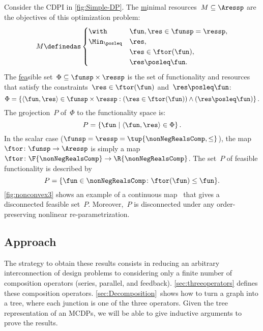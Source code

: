 \begin{example}
  \label{exa:one}
  Consider the CDPI in \cref{fig:Simple-DP}. The \uline{m}inimal resources~$M\subseteq\Aressp$ are the objectives of this optimization problem:
  \[
    M\definedas\begin{cases}
                 \with & \fun,\res\in\funsp=\ressp,\\
                 \Min_{\posleq} & \res,\\
                 & \res\in\ftor(\fun),\\
                 & \res\posleq\fun.
    \end{cases}
  \]
  The \uline{fea}sible set~$\Phi\subseteq\funsp\times\ressp$ is
  the set of functionality and resources that satisfy the constraints~$\res\in\ftor(\fun)$
  and~$\res\posleq\fun$:
  \begin{equation}
    \Phi=\left\{ \langle\fun,\res\rangle\in\funsp\times\ressp:(\res\in\ftor(\fun))\wedge(\res\posleq\fun)\right\} .\label{eq:feasible}
  \end{equation}
  The \uline{p}rojection~$P$ of~$\Phi$ to the functionality space
  is:
  \begin{equation*}
    P=\left\{ \fun\mid\left\langle \fun,\res\right\rangle \in\Phi\right\}.
  \end{equation*}
  In the scalar case ($\funsp=\ressp=\tup{\nonNegRealsComp,\leq}$),
  the map~$\ftor\colon\funsp\to\Aressp$ is simply a map~$\ftor\colon\F{\nonNegRealsComp}\to\R{\nonNegRealsComp}$.
  The set~$P$ of feasible functionality is described by
  \begin{equation}
    P=\{\fun\in\nonNegRealsComp\colon \ftor(\fun)\leq\fun\}.\label{eq:Pfeasible}
  \end{equation}
  \cref{fig:nonconvex3} shows an example of a continuous map~\ftor
  that gives a disconnected feasible set~$P$. Moreover,~$P$ is disconnected
  under any order-preserving nonlinear re-parametrization.

\end{example}

\subsection{Approach}

The strategy to obtain these results consists in reducing an arbitrary
interconnection of design problems to considering only a finite
number of composition operators (series, parallel, and feedback).
\cref{sec:threeoperators} defines these composition operators. \cref{sec:Decomposition}~shows
how to turn a graph into a tree, where each junction is one of the
three operators. Given the tree representation of an MCDPs, we will
be able to give inductive arguments to prove the results.


